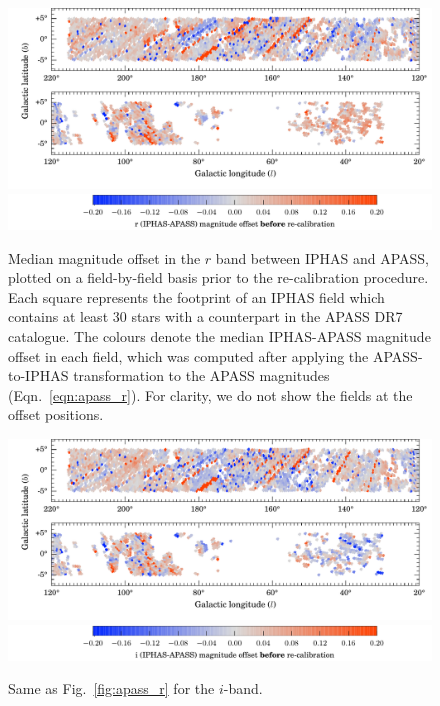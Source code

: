 \documentclass[a4paper,useAMS,usenatbib]{mn2e}
\begin{document}
\begin{figure}
    \includegraphics[width=\textwidth]{figures/calibration/APASS-IPHAS-DR2_rshift.pdf} 
    \includegraphics[width=\textwidth]{figures/calibration/colourbar_apass_r.pdf} 
    \caption{Median magnitude offset in the $r$ band between IPHAS and APASS,
             plotted on a field-by-field basis
             prior to the re-calibration procedure.
             Each square represents the footprint of an IPHAS field
             which contains at least 30 stars with a counterpart
             in the APASS DR7 catalogue.
             The colours denote the median
             IPHAS-APASS magnitude offset in each field,
             which was computed after applying the APASS-to-IPHAS
             transformation to the APASS magnitudes (Eqn.~\ref{eqn:apass_r}).
             For clarity, we do not show the fields at the offset positions.}
        \label{fig:apass_r}
    \vspace{1cm}
    \includegraphics[width=\textwidth]{figures/calibration/APASS-IPHAS-DR2_ishift.pdf} 
    \includegraphics[width=\textwidth]{figures/calibration/colourbar_apass_i.pdf} 
    \caption{Same as Fig.~\ref{fig:apass_r} for the $i$-band.}
    \label{fig:apass_i}
\end{figure}
\end{document}
